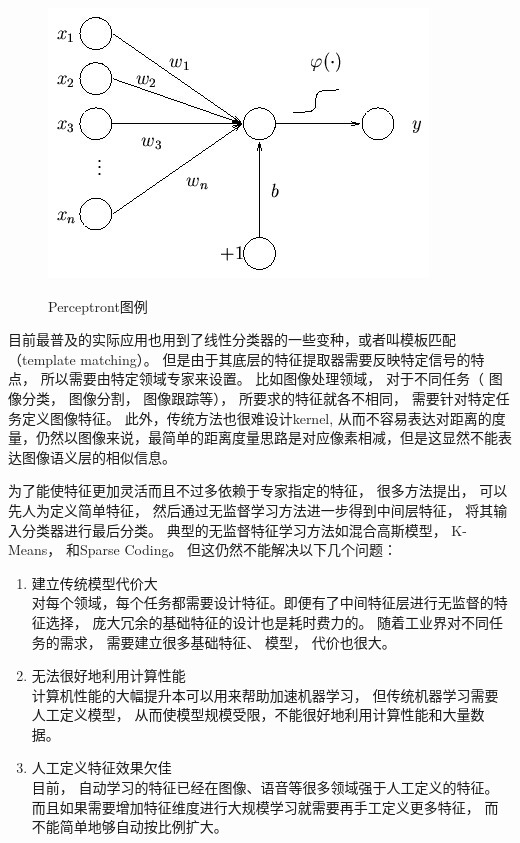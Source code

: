 \begin{figure}[htb]
  \centering
  \includegraphics[scale=0.9]{Pictures/CNN/perceptron.jpg}\\
  \caption{Perceptront图例}\label{fig:perceptron}
\end{figure}

目前最普及的实际应用也用到了线性分类器的一些变种，或者叫模板匹配（template matching）。 但是由于其底层的特征提取器需要反映特定信号的特点， 所以需要由特定领域专家来设置。 比如图像处理领域， 对于不同任务（ 图像分类， 图像分割， 图像跟踪等）， 所要求的特征就各不相同， 需要针对特定任务定义图像特征。 此外，传统方法也很难设计kernel, 从而不容易表达对距离的度量，仍然以图像来说，最简单的距离度量思路是对应像素相减，但是这显然不能表达图像语义层的相似信息。

为了能使特征更加灵活而且不过多依赖于专家指定的特征， 很多方法提出， 可以先人为定义简单特征， 然后通过无监督学习方法进一步得到中间层特征， 将其输入分类器进行最后分类。
典型的无监督特征学习方法如混合高斯模型\cite{jeong2004image,gray2001gauss,gauvain1992bayesian,reynolds2000speaker,reynolds1995robust, zivkovic2004improved,lee2005effective,yang1999gaussian}， K-Means\cite{liu2007computational,netzer2011reading,coates2011text,dy2004feature,coates2012learning}， 和Sparse Coding\cite{yang2009linear,boureau2008sparse,coates2011importance,coates2011analysis,gao2010local,mairal2010online}。 但这仍然不能解决以下几个问题：

\begin{enumerate}
	\item 建立传统模型代价大\\
	对每个领域，每个任务都需要设计特征。即便有了中间特征层进行无监督的特征选择， 庞大冗余的基础特征的设计也是耗时费力的。 随着工业界对不同任务的需求， 需要建立很多基础特征、 模型， 代价也很大。
	\item 无法很好地利用计算性能\\
	计算机性能的大幅提升本可以用来帮助加速机器学习， 但传统机器学习需要人工定义模型， 从而使模型规模受限，不能很好地利用计算性能和大量数据。 
	
	\item 人工定义特征效果欠佳\\
	目前， 自动学习的特征已经在图像、语音等很多领域强于人工定义的特征。 而且如果需要增加特征维度进行大规模学习就需要再手工定义更多特征， 而不能简单地够自动按比例扩大。
	
\end{enumerate}


